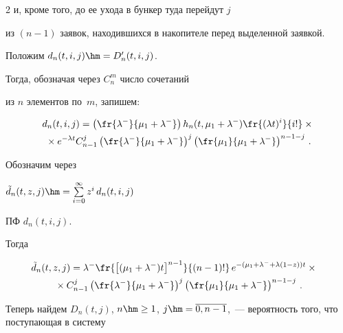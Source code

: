 \begin{multicols}{2}
и, кроме того, до ее ухода в бункер туда перейдут $j$


из $(n-1)$ заявок, находившихся в накопителе перед выделенной заявкой.


Положим $d_n(t,i,j) \hm= D'_n(t,i,j)$.


Тогда, обозначая через $C_{n}^m$ число сочетаний


из $n$ элементов по~$m$, запишем:




\begin{multline*}


d_n(t,i,j) = \left( \fr{\lambda^- }{\mu_1 + \lambda^-}\right)h_n(t,\mu_1+\lambda^-)


\fr{(\lambda t)^i }{i! }\times{}\\


{}\times e^{-\lambda t}


C_{n-1}^j \left(\fr{\lambda^-}{\mu_1 + \lambda^-}\right)^j


          \left(\fr{\mu_1 }{\mu_1 + \lambda^-}\right)^{n-1-j}\,.


\end{multline*}





Обозначим через


$\tilde d_n(t,z,j)\hm=\sum\limits_{i=0}^\infty z^i\, d_n(t,i,j)$


ПФ $d_n(t,i,j)$.


Тогда


\begin{multline*}


\!\!\!\!\!\tilde d_n(t,z,j) = \lambda^-


\fr{\left[(\mu_1+\lambda^-)t\right]^{n-1}}{ (n-1)!}\,


e^{-(\mu_1+\lambda^- + \lambda (1-z))t}\times{}\\


{}\times


C_{n-1}^j \left(\fr{\lambda^-}{\mu_1 + \lambda^-}\right)^j


          \left(\fr{\mu_1 }{\mu_1 + \lambda^-}\right)^{n-1-j}\,.


\end{multline*}










Теперь найдем $D_n(t,j)$, $n \hm\ge 1$, $j\hm=\overline{0,n-1}$,~--- вероятность того, что поступающая в систему 



\end{multicols}
